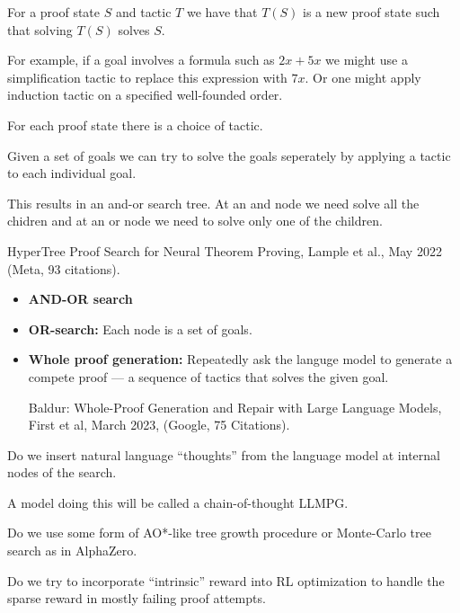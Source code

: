 {

\vfill
For a proof state $S$ and tactic $T$ we have that $T(S)$ is a new proof state such that solving $T(S)$ solves $S$.

\vfill
For example, if a goal involves a formula such as $2x+5x$ we might use a simplification tactic to replace this expression with $7x$.
Or one might apply induction tactic on a specified well-founded order.

\vfill
For each proof state there is a choice of tactic.


Given a set of goals we can try to solve the goals seperately by applying a tactic to each individual goal.

\vfill
This results in an and-or search tree.  At an and node we need solve all the chidren and at an or node we need to
solve only one of the children.

\vfill
HyperTree Proof Search for Neural Theorem Proving, Lample et al., May 2022 (Meta, 93 citations).


\begin{itemize}
\item {\bf AND-OR search}

\vfill
\item {\bf OR-search:} Each node is a set of goals.

\vfill
\item {\bf Whole proof generation:}
Repeatedly ask the languge model to generate
a compete proof --- a sequence of tactics that solves the given goal.

\vfill
Baldur: Whole-Proof Generation and Repair with Large Language Models, First et al, March 2023, (Google, 75 Citations).
\end{itemize}



Do we insert natural language ``thoughts'' from the language model at internal nodes of the search.

\vfill
A model doing this will be called a chain-of-thought LLMPG.


Do we use some form of AO*-like tree growth procedure or Monte-Carlo tree search as in AlphaZero.

\vfill
Do we try to incorporate ``intrinsic'' reward into RL optimization to handle the sparse reward in mostly
failing proof attempts.

}
